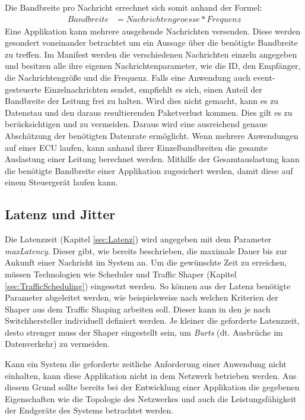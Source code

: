 Die Bandbreite pro Nachricht errechnet sich somit anhand der Formel:
\begin{align}
	Bandbreite &= Nachrichtengroesse * Frequenz
\end{align}
Eine Applikation kann mehrere ausgehende Nachrichten versenden. Diese werden gesondert voneinander betrachtet um ein Aussage über die benötigte Bandbreite zu treffen. Im Manifest werden die verschiedenen Nachrichten einzeln angegeben und besitzen alle ihre eigenen Nachrichtenparameter, wie die \ac{ID}, den Empfänger, die Nachrichtengröße und die Frequenz. Falls eine Anwendung auch event-gesteuerte Einzelnachrichten sendet, empfiehlt es sich, einen Anteil der Bandbreite der Leitung frei zu halten. Wird dies nicht gemacht, kann es zu Datenstau und den daraus resultierenden Paketverlust kommen. Dies gilt es zu berücksichtigen und zu vermeiden. Daraus wird eine ausreichend genaue Abschätzung der benötigten Datenrate ermöglicht.
\newline
Wenn mehrere Anwendungen auf einer \ac{ECU} laufen, kann anhand ihrer Einzelbandbreiten die gesamte Auslastung einer Leitung berechnet werden. Mithilfe der Gesamtauslastung kann die benötigte Bandbreite einer Applikation zugesichert werden, damit diese auf einem Steuergerät laufen kann. 

\subsection{Latenz und Jitter}\label{sec:RechnungJitter}
Die Latenzzeit (Kapitel \ref{sec:Latenz}) wird angegeben mit dem Parameter \emph{maxLatency}. Dieser gibt, wie bereits beschrieben, die maximale Dauer bis zur Ankunft einer Nachricht im System an.
Um die gewünschte Zeit zu erreichen, müssen Technologien wie Scheduler und Traffic Shaper (Kapitel \ref{sec:TrafficScheduling}) eingesetzt werden. So können aus der Latenz benötigte Parameter abgeleitet werden, wie beispielsweise nach welchen Kriterien der Shaper aus dem Traffic Shaping arbeiten soll. Dieser kann in den je nach Switchhersteller individuell definiert werden. Je kleiner die geforderte Latenzzeit, desto strenger muss der Shaper eingestellt sein, um \emph{Burts} (dt. Ausbrüche im Datenverkehr) zu vermeiden.

Kann ein System die geforderte zeitliche Anforderung einer Anwendung nicht einhalten, kann diese Applikation nicht in dem Netzwerk betrieben werden. Aus diesem Grund sollte bereits bei der Entwicklung einer Applikation die gegebenen Eigenschaften wie die Topologie des Netzwerkes und auch die Leistungsfähigkeit der Endgeräte des Systems betrachtet werden.

